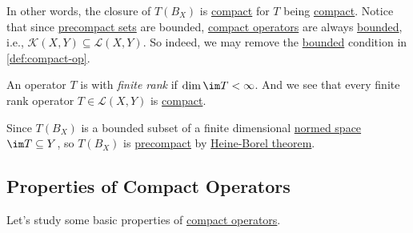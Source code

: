 In other words, the closure of \(T(B_X)\) is \hyperref[def:compact]{compact} for \(T\) being \hyperref[def:compact-op]{compact}. Notice that since \hyperref[def:precompact]{precompact sets} are bounded, \hyperref[def:compact-op]{compact operators} are always \hyperref[def:bounded-map]{bounded}, i.e., \(\mathcal{K} (X, Y)\subseteq \mathcal{L} (X, Y)\). So indeed, we may remove the \hyperref[def:bounded-map]{bounded} condition in \autoref{def:compact-op}.

\begin{remark}\label{rmk:finite-rank-op}
	An operator \(T\) is with \emph{finite rank} if \(\dim \im T < \infty \). And we see that every finite rank operator \(T\in \mathcal{L} (X, Y)\) is \hyperref[def:compact-op]{compact}.
\end{remark}
\begin{explanation}
	Since \(T(B_X)\) is a bounded subset of a finite dimensional \hyperref[def:normed-vector-space]{normed space} \(\im T \subseteq Y\), so \(T(B_X)\) is \hyperref[def:precompact]{precompact} by \hyperref[thm:Heine-Borel]{Heine-Borel theorem}.
\end{explanation}

\subsection{Properties of Compact Operators}
Let's study some basic properties of \hyperref[def:compact-op]{compact operators}.

